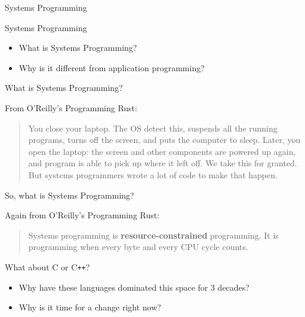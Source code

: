 \begin{section}{Systems Programming}

  \begin{frame}{Systems Programming}
    \begin{itemize}
    \item What is Systems Programming?
    \item Why is it different from application programming?
    \end{itemize}
  \end{frame}

  \begin{frame}{What is Systems Programming?}
    \begin{block}{From O'Reilly's Programming Rust\cite{ProgrammingRust}:}
      \begin{quotation}
        You close your laptop. The OS detect this, suspends all the
        running programs, turns off the screen, and puts the computer to
        sleep. Later, you open the laptop: the screen and other components are
        powered up again, and program is able to pick up where it left
        off. We take this for granted. But systems programmers wrote a lot of
        code to make that happen.
      \end{quotation}
    \end{block}
  \end{frame}

  \begin{frame}{So, what is Systems Programming?}
    \begin{block}{Again from O'Reilly's Programming Rust\cite{ProgrammingRust}:}
      \begin{quotation}
        Systems programming is \textbf{resource-constrained}
        programming. It is programming when every byte and every CPU cycle
        counts.
      \end{quotation}
    \end{block}
  \end{frame}

  \begin{frame}{What about C or C\texttt{++}?}
    \begin{itemize}
    \item Why have these languages dominated this space for 3 decades?
    \item Why is it time for a change right now?
    \end{itemize}
  \end{frame}

\end{section}
